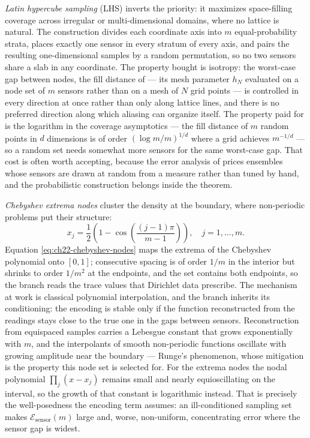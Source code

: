 \emph{Latin hypercube sampling} (LHS) inverts the priority: it maximizes space-filling coverage
across irregular or multi-dimensional domains, where no lattice is natural. The construction divides each coordinate axis into $m$ equal-probability
strata, places exactly one sensor in every stratum of every axis, and pairs the resulting
one-dimensional samples by a random permutation, so no two sensors share a slab in any
coordinate. The property bought is isotropy: the worst-case gap between nodes, the fill
distance of  --- its mesh parameter
$h_N$ evaluated on a node set of $m$ sensors rather than on a mesh of $N$ grid
points --- is controlled in every direction at once rather than only along lattice
lines, and there is no preferred direction along which aliasing can organize itself. The
property paid for is the logarithm in the coverage asymptotics --- the fill distance of $m$
random points in $d$ dimensions is of order
$(\log m / m)^{1/d}$ where a grid achieves $m^{-1/d}$ --- so a random set needs somewhat more
sensors for the same worst-case gap. That cost is often worth accepting, because the error
analysis of \cite{lanthaler2022error} prices ensembles whose sensors are drawn at random from
a measure rather than tuned by hand, and the probabilistic construction
belongs inside the theorem.

\emph{Chebyshev extrema nodes} cluster the density at the boundary, where non-periodic problems
put their structure:
\begin{equation}
  \label{eq:ch22-chebyshev-nodes}
  x_j = \frac{1}{2} \left( 1 - \cos\left( \frac{(j-1)\pi}{m-1} \right) \right), \quad j = 1, \dots, m.
\end{equation}
Equation \eqref{eq:ch22-chebyshev-nodes} maps the extrema of the Chebyshev polynomial onto
$[0,1]$; consecutive spacing is of order $1/m$ in the interior but shrinks to order
$1/m^{2}$ at the endpoints, and the set contains both endpoints, so the branch reads the trace
values that Dirichlet data prescribe. The mechanism at work is
classical polynomial interpolation, and the branch inherits its conditioning: the encoding is
stable only if the function reconstructed from the readings stays close to the true one in the
gaps between sensors. Reconstruction from equispaced samples carries a Lebesgue constant that
grows exponentially with $m$, and the interpolants of smooth non-periodic functions oscillate
with growing amplitude near the boundary --- Runge's phenomenon, whose
mitigation is the property this node set is selected for. For the extrema nodes the nodal
polynomial $\prod_j (x - x_j)$ remains small and nearly equioscillating on the interval, so the
growth of that constant is logarithmic instead. That is precisely the well-posedness the
encoding term assumes: an ill-conditioned sampling set makes $\mathcal{E}_{\text{sensor}}(m)$
large and, worse, non-uniform, concentrating error where the sensor gap is widest.

